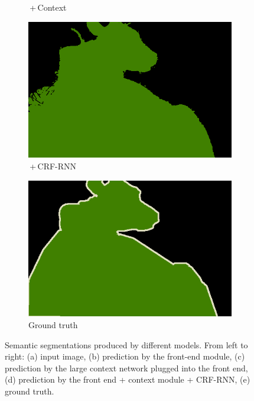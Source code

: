 \documentclass{article} %
\begin{document}
\begin{figure}[t]
\begin{subfigure}[b]{0.19\linewidth}
	\caption{\,+\,Context}
  \end{subfigure}
  \begin{subfigure}[b]{0.19\linewidth}
    \includegraphics[width=\textwidth]{figs/ab/crf/2007_000491}
	\caption{\,+\,CRF-RNN}
  \end{subfigure}
  \begin{subfigure}[b]{0.19\linewidth}
    \includegraphics[width=\textwidth]{figs/ab/gt/2007_000491}
	\caption{Ground truth}
  \end{subfigure}

\vspace{-2mm}
\caption{Semantic segmentations produced by different models. From left to right: (a) input image, (b) prediction by the front-end module, (c) prediction by the large context network plugged into the front end, (d) prediction by the front end + context module + CRF-RNN, (e) ground truth.}
\label{fig:controlled}


\end{figure}
\end{document}

